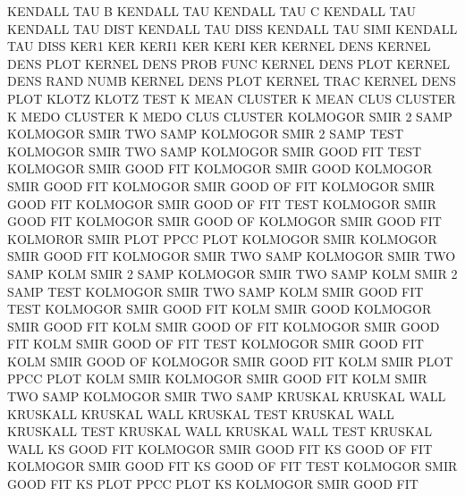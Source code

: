 KENDALL  TAU  B                         KENDALL  TAU
KENDALL  TAU  C                         KENDALL  TAU
KENDALL  TAU  DIST                      KENDALL  TAU  DISS
KENDALL  TAU  SIMI                      KENDALL  TAU  DISS
KER1                                    KER
KERI1                                   KER
KERI                                    KER
KERNEL   DENS                           KERNEL   DENS PLOT
KERNEL   DENS PROB FUNC                 KERNEL   DENS PLOT
KERNEL   DENS RAND NUMB                 KERNEL   DENS PLOT
KERNEL   TRAC                           KERNEL   DENS PLOT
KLOTZ                                   KLOTZ    TEST
K        MEAN                           CLUSTER
K        MEAN CLUS                      CLUSTER
K        MEDO                           CLUSTER
K        MEDO CLUS                      CLUSTER
KOLMOGOR SMIR 2    SAMP                 KOLMOGOR SMIR TWO  SAMP
KOLMOGOR SMIR 2    SAMP TEST            KOLMOGOR SMIR TWO  SAMP
KOLMOGOR SMIR GOOD FIT  TEST            KOLMOGOR SMIR GOOD FIT
KOLMOGOR SMIR GOOD                      KOLMOGOR SMIR GOOD FIT
KOLMOGOR SMIR GOOD OF   FIT             KOLMOGOR SMIR GOOD FIT
KOLMOGOR SMIR GOOD OF   FIT  TEST       KOLMOGOR SMIR GOOD FIT
KOLMOGOR SMIR GOOD OF                   KOLMOGOR SMIR GOOD FIT
KOLMOROR SMIR PLOT                      PPCC     PLOT
KOLMOGOR SMIR                           KOLMOGOR SMIR GOOD FIT
KOLMOGOR SMIR TWO  SAMP                 KOLMOGOR SMIR TWO  SAMP
KOLM     SMIR 2    SAMP                 KOLMOGOR SMIR TWO  SAMP
KOLM     SMIR 2    SAMP TEST            KOLMOGOR SMIR TWO  SAMP
KOLM     SMIR GOOD FIT  TEST            KOLMOGOR SMIR GOOD FIT
KOLM     SMIR GOOD                      KOLMOGOR SMIR GOOD FIT
KOLM     SMIR GOOD OF   FIT             KOLMOGOR SMIR GOOD FIT
KOLM     SMIR GOOD OF   FIT  TEST       KOLMOGOR SMIR GOOD FIT
KOLM     SMIR GOOD OF                   KOLMOGOR SMIR GOOD FIT
KOLM     SMIR PLOT                      PPCC     PLOT
KOLM     SMIR                           KOLMOGOR SMIR GOOD FIT
KOLM     SMIR TWO  SAMP                 KOLMOGOR SMIR TWO  SAMP
KRUSKAL                                 KRUSKAL  WALL
KRUSKALL                                KRUSKAL  WALL
KRUSKAL  TEST                           KRUSKAL  WALL
KRUSKALL TEST                           KRUSKAL  WALL
KRUSKAL  WALL TEST                      KRUSKAL  WALL
KS       GOOD FIT                       KOLMOGOR SMIR GOOD FIT
KS       GOOD OF   FIT                  KOLMOGOR SMIR GOOD FIT
KS       GOOD OF   FIT  TEST            KOLMOGOR SMIR GOOD FIT
KS       PLOT                           PPCC     PLOT
KS                                      KOLMOGOR SMIR GOOD FIT
